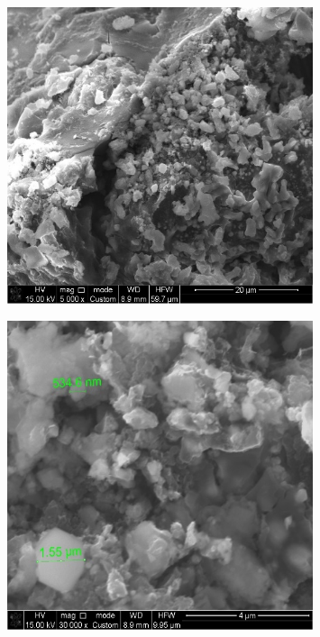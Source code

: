 \begin{figure}[H]
	\centering
	\includegraphics[width=0.8\textwidth]{media/chem2/image10}
	\caption*{}
\end{figure}

\begin{figure}[H]
	\centering
	\includegraphics[width=0.8\textwidth]{media/chem2/image11}
	\caption*{}
\end{figure}

